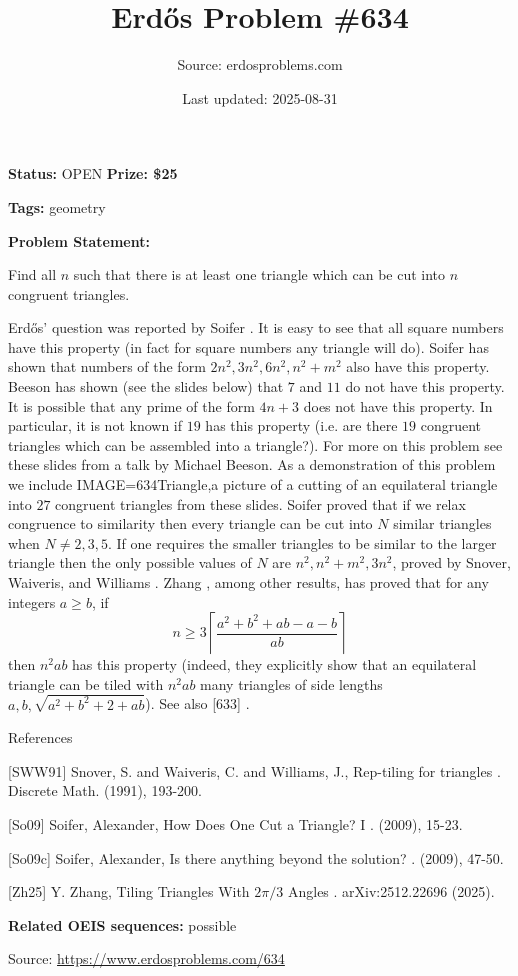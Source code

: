\documentclass{article}
\title{Erd\H{o}s Problem \#634}
\date{Last updated: 2025-08-31}
\author{Source: erdosproblems.com}
\begin{document}
\maketitle

\noindent\textbf{Status:} OPEN \quad \textbf{Prize: \$25}

\noindent\textbf{Tags:} geometry

\medskip

\noindent\textbf{Problem Statement:}

Find all $n$ such that there is at least one triangle which can be cut into $n$ congruent triangles.




Erd\H{o}s' question was reported by Soifer \cite{So09c}. It is easy to see that all square numbers have this property (in fact for square numbers any triangle will do). Soifer \cite{So09c} has shown that numbers of the form $2n^2,3n^2,6n^2,n^2+m^2$ also have this property. Beeson has shown (see the slides below) that $7$ and $11$ do not have this property. It is possible that any prime of the form $4n+3$ does not have this property. In particular, it is not known if $19$ has this property (i.e. are there $19$ congruent triangles which can be assembled into a triangle?). For more on this problem see these slides from a talk by Michael Beeson. As a demonstration of this problem we include {IMAGE=634Triangle,a picture} of a cutting of an equilateral triangle into $27$ congruent triangles from these slides. Soifer proved \cite{So09} that if we relax congruence to similarity then every triangle can be cut into $N$ similar triangles when $N\neq 2,3,5$. If one requires the smaller triangles to be similar to the larger triangle then the only possible values of $N$ are $n^2,n^2+m^2,3n^2$, proved by Snover, Waiveris, and Williams \cite{SWW91}. Zhang \cite{Zh25}, among other results, has proved that for any integers $a \geq b$, if\[n\geq 3\left\lceil \frac{a^2+b^2+ab-a-b}{ab}\right\rceil\]then $n^2ab$ has this property (indeed, they explicitly show that an equilateral triangle can be tiled with $n^2ab$ many triangles of side lengths $a,b,\sqrt{a^2+b^2+2+ab}$). See also [633] .




References

[SWW91] Snover, S. and Waiveris, C. and Williams, J., Rep-tiling for triangles . Discrete Math. (1991), 193-200.

[So09] Soifer, Alexander, How Does One Cut a Triangle? I . (2009), 15-23.

[So09c] Soifer, Alexander, Is there anything beyond the solution? . (2009), 47-50.

[Zh25] Y. Zhang, Tiling Triangles With $2\pi/3$ Angles . arXiv:2512.22696 (2025).

\noindent\textbf{Related OEIS sequences:} possible


\bigskip
\noindent\small{Source: \url{https://www.erdosproblems.com/634}}
\end{document}
